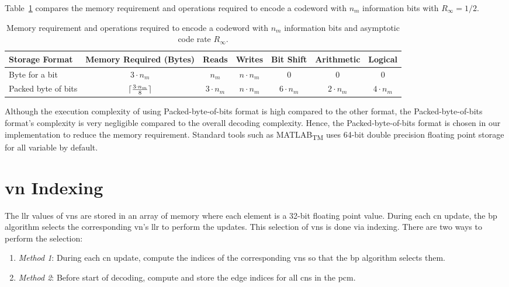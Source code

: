 Table~\ref{tab:summ_mem_req} compares the memory requirement and operations required to encode a codeword with $n_m$ information bits with $R_\infty=1/2$.
\begin{table}[htbp]
  \centering
  \begin{tabular}{|l|c|c|c|c|c|c|}
    \hline
    \textbf{Storage Format} &\textbf{Memory Required (Bytes)} &\textbf{Reads} &\textbf{Writes} &\textbf{Bit Shift} &\textbf{Arithmetic} &\textbf{Logical}\\
    \hline
    \hline
    Byte for a bit &$3\cdot n_m$ &$n_m$ &$n\cdot n_m$ &0 &0 &0\\
    \hline
    Packed byte of bits &$\lceil\frac{3\cdot n_m}{8}\rceil$ &$3\cdot n_m$ &$n\cdot n_m$ &$6\cdot n_m$ &$2\cdot n_m$ &$4\cdot n_m$\\
    \hline
  \end{tabular}
  \caption[Memory and complexity of different storage formats.]{Memory requirement and operations required to encode a codeword with $n_m$ information bits and asymptotic code rate $R_\infty$.}
  \label{tab:summ_mem_req}
\end{table}

Although the execution complexity of using Packed-byte-of-bits format is high compared to the other format, the Packed-byte-of-bits format's complexity is very negligible compared to the overall decoding complexity. Hence, the Packed-byte-of-bits format is chosen in our implementation to reduce the memory requirement. Standard tools such as MATLAB\textsubscript{TM} uses 64-bit double precision floating point storage for all variable by default.

\section{\acrlong{vn} Indexing}
The \gls{llr} values of \glspl{vn} are stored in an array of memory where each element is a 32-bit floating point value. During each \gls{cn} update, the \gls{bp} algorithm selects the corresponding \gls{vn}'s \gls{llr} to perform the updates. This selection of \glspl{vn} is done via indexing. There are two ways to perform the selection:
\begin{enumerate}
  \item \emph{Method 1}: During each \gls{cn} update, compute the indices of the corresponding \glspl{vn} so that the \gls{bp} algorithm selects them.
  \item \emph{Method 2}: Before start of decoding, compute and store the edge indices for all \glspl{cn} in the \gls{pcm}.
\end{enumerate}

